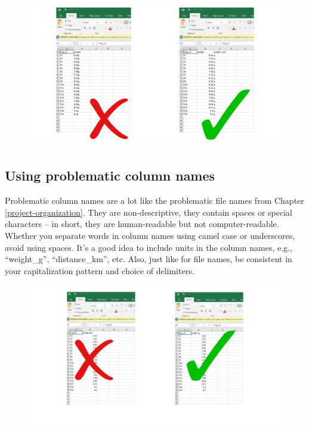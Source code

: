 \documentclass[
]{book}
\begin{document}
\begin{figure}

{\centering \includegraphics[width=1\linewidth]{img/spreadsheets_06} 

}

\caption{ }\label{fig:ss6}
\end{figure}

\hypertarget{using-problematic-column-names}{%
\subsection{Using problematic column names}\label{using-problematic-column-names}}

Problematic column names are a lot like the problematic file names from Chapter \ref{project-organization}. They are non-descriptive, they contain spaces or special characters -- in short, they are human-readable but not computer-readable. Whether you separate words in column names using camel case or underscores, avoid using spaces. It's a good idea to include units in the column names, e.g., ``weight\_g'', ``distance\_km'', etc. Also, just like for file names, be consistent in your capitalization pattern and choice of delimiters.

\begin{figure}

{\centering \includegraphics[width=1\linewidth]{img/spreadsheets_07} 

}

\caption{ }\label{fig:ss7}
\end{figure}
\end{document}
